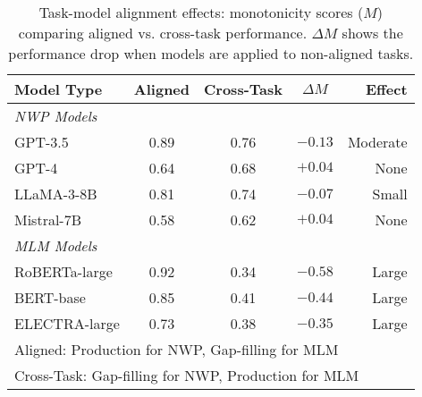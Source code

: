 \begin{table}[ht]
\centering
\caption{Task-model alignment effects: monotonicity scores ($M$) comparing aligned vs. cross-task performance. $\Delta M$ shows the performance drop when models are applied to non-aligned tasks.}
\label{tab:cross_task_comparison}
\small
\begin{tabular}{lcccr}
\toprule
\textbf{Model Type} & \textbf{Aligned} & \textbf{Cross-Task} & \textbf{$\Delta M$} & \textbf{Effect} \\
\midrule
\multicolumn{5}{l}{\textit{NWP Models}} \\
GPT-3.5 & 0.89 & 0.76 & $-0.13$ & Moderate \\
GPT-4 & 0.64 & 0.68 & $+0.04$ & None \\
LLaMA-3-8B & 0.81 & 0.74 & $-0.07$ & Small \\
Mistral-7B & 0.58 & 0.62 & $+0.04$ & None \\
\midrule
\multicolumn{5}{l}{\textit{MLM Models}} \\
RoBERTa-large & 0.92 & 0.34 & $-0.58$ & Large \\
BERT-base & 0.85 & 0.41 & $-0.44$ & Large \\
ELECTRA-large & 0.73 & 0.38 & $-0.35$ & Large \\
\midrule
\multicolumn{5}{l}{\footnotesize{Aligned: Production for NWP, Gap-filling for MLM}} \\
\multicolumn{5}{l}{\footnotesize{Cross-Task: Gap-filling for NWP, Production for MLM}} \\
\bottomrule
\end{tabular}
\end{table}
